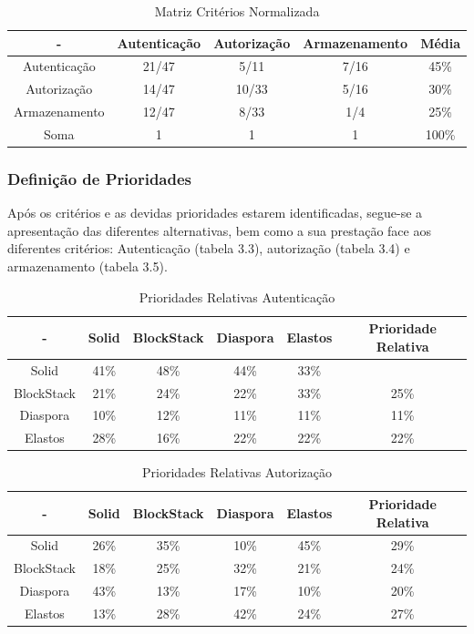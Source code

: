 \begin{table}[h]
\centering
\caption{Matriz Critérios Normalizada}
\label{table_matriz_criterios_normalizada}
\vspace{0.5cm}
\begin{tabular}{c|c|c|c|c}
\centering
 - & Autenticação & Autorização & Armazenamento & Média \\
\hline                               
Autenticação & 21/47 & 5/11 & 7/16 & 45\% \\
Autorização &  14/47 & 10/33 & 5/16 & 30\% \\
Armazenamento &  12/47 &  8/33 & 1/4 & 25\% \\
Soma & 1 & 1 & 1 & 100\% \\
\end{tabular}
\end{table}

\pagebreak

\subsubsection{Definição de Prioridades}
Após os critérios e as devidas prioridades estarem identificadas, segue-se a apresentação das diferentes alternativas, bem como a sua prestação face aos diferentes critérios: Autenticação (tabela 3.3), autorização (tabela 3.4) e armazenamento (tabela 3.5). 

\begin{table}[H]
\centering
\caption{Prioridades Relativas Autenticação}
\vspace{0.5cm}
\begin{tabular}{c|c|c|c|c|c} 
 - & Solid & BlockStack & Diaspora & Elastos & Prioridade Relativa \\
\hline                               
Solid & 41\% &	48\% &	44\% & 33\% \\
BlockStack &  21\% & 24\% &	22\% &	33\% &	25\% \\
Diaspora &  10\% &	12\% &	11\% & 11\%	& 11\% \\
Elastos & 28\% & 16\% & 22\% & 22\% & 22\% \\
\end{tabular}
\end{table}

\begin{table}[H]
\centering
\caption{Prioridades Relativas Autorização}
\vspace{0.5cm}
\begin{tabular}{c|c|c|c|c|c} 
 - & Solid & BlockStack & Diaspora & Elastos & Prioridade Relativa \\
\hline                               
Solid & 26\% &	35\% &	10\% & 45\% & 29\% \\
BlockStack &  18\% & 25\% & 32\% & 21\% & 24\% \\
Diaspora &  43\% &	13\% &	17\% &	10\% & 20\% \\
Elastos & 13\% & 28\% &	42\% & 24\% & 27\% \\
\end{tabular}
\end{table}

